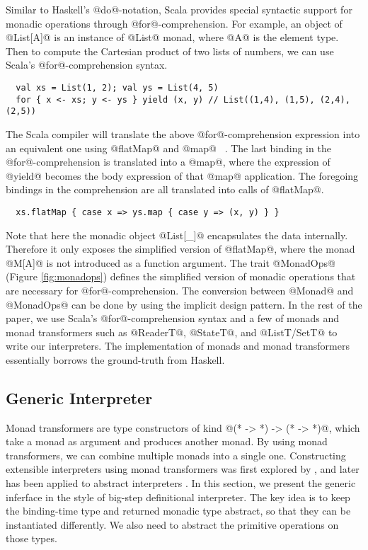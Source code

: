 Similar to Haskell's @do@-notation, Scala provides special syntactic support for
monadic operations through @for@-comprehension.
For example, an object of @List[A]@ is an instance of @List@ monad, where @A@ is the element type. 
Then to compute the Cartesian product of two lists of numbers, we can use Scala's
@for@-comprehension syntax.
\begin{lstlisting}
  val xs = List(1, 2); val ys = List(4, 5)
  for { x <- xs; y <- ys } yield (x, y) // List((1,4), (1,5), (2,4), (2,5))
\end{lstlisting}

The Scala compiler will translate the above @for@-comprehension expression into
an equivalent one using @flatMap@ and @map@ ~\cite{scala_spec}. The last binding
in the @for@-comprehension is translated into a @map@, where the expression of
@yield@ becomes the body expression of that @map@ application. The foregoing
bindings in the comprehension are all translated into calls of @flatMap@.
\begin{lstlisting}
  xs.flatMap { case x => ys.map { case y => (x, y) } }
\end{lstlisting}

Note that here the monadic object @List[_]@ encapsulates the data
internally.  Therefore it only exposes the simplified version of
@flatMap@, where the monad @M[A]@ is not introduced as a function
argument. The trait @MonadOps@ (Figure \ref{fig:monadops}) defines the
simplified version of monadic operations that are necessary for
@for@-comprehension. The conversion between @Monad@ and @MonadOps@
can be done by using the implicit design pattern.
In the rest of the paper, we use Scala's @for@-comprehension syntax
and a few of monads and monad transformers such as @ReaderT@,
@StateT@, and @ListT/SetT@ to write our interpreters. The implementation
of monads and monad transformers essentially borrows the ground-truth
from Haskell.

\subsection{Generic Interpreter} \label{generic_if}

Monad transformers are type constructors of kind @(* -> *) -> (* -> *)@, which
take a monad as argument and produces another monad. By using monad
transformers, we can combine multiple monads into a single one. Constructing
extensible interpreters using monad transformers was first explored by
\citet{DBLP:conf/popl/LiangHJ95}, and later has been applied to abstract
interpreters \cite{Sergey:2013:MAI:2491956.2491979,
  DBLP:journals/pacmpl/DaraisLNH17, Darais:2015:GTM:2814270.2814308}.
In this section, we present the generic inferface in the style of big-step
definitional interpreter. The key idea is to keep the binding-time type and
returned monadic type abstract, so that they can be instantiated differently.
We also need to abstract the primitive operations on those types.

